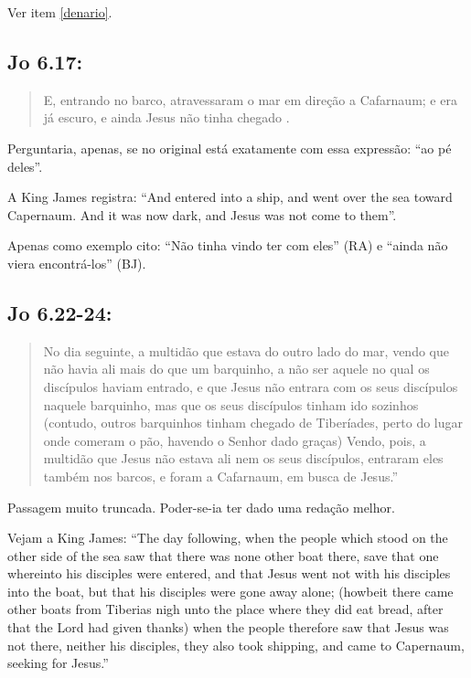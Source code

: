 Ver item \ref{denario}.

\subsection*{Jo 6.17:}
\begin{quote}
    \small
E, entrando no barco, atravessaram o mar em direção a Cafarnaum; e era já escuro, e ainda Jesus não tinha chegado .
\end{quote}

Perguntaria, apenas, se no original está exatamente com essa expressão: ``ao pé deles''.

A King James registra: ``And entered into a ship, and went over the sea toward Capernaum. And it was now dark, and Jesus was not come to them''.

Apenas como exemplo cito: ``Não tinha vindo ter com eles'' (RA) e ``ainda não viera encontrá-los'' (BJ).

\subsection*{Jo 6.22-24:}
\begin{quote}
    \small
No dia seguinte, a multidão que estava do outro lado do mar, vendo que não havia ali mais do que um barquinho, a não ser aquele no qual os discípulos haviam entrado, e que Jesus não entrara com os seus discípulos naquele barquinho, mas que os seus discípulos tinham ido sozinhos (contudo, outros barquinhos tinham chegado de Tiberíades, perto do lugar onde comeram o pão, havendo o Senhor dado graças) Vendo, pois, a multidão que Jesus não estava ali nem os seus discípulos, entraram eles também nos barcos, e foram a Cafarnaum, em busca de Jesus.''
\end{quote}

Passagem muito truncada. Poder-se-ia ter dado uma redação melhor.

Vejam a King James: ``The day following, when the people which stood on the other side of the sea saw that there was none other boat there, save that one whereinto his disciples were entered, and that Jesus went not with his disciples into the boat, but that his disciples were gone away alone; (howbeit there came other boats from Tiberias nigh unto the place where they did eat bread, after that the Lord had given thanks) when the people therefore saw that Jesus was not there, neither his disciples, they also took shipping, and came to Capernaum, seeking for Jesus.''

